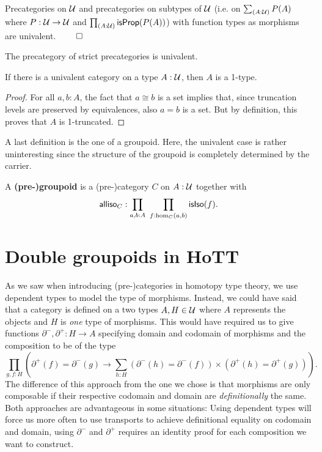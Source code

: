 \begin{lemma}
Precategories on $\mathcal{U}$ and 	precategories on subtypes of $\mathcal{U}$ (i.e. on
$\sum_{(A : \mathcal{U})} P(A)$ where $P : \mathcal{U} \to \mathcal{U}$ and $\prod_{(A : \mathcal{U})} \mathsf{isProp}(P(A))$)
with function types as morphisms are univalent. \hfill $\qed$
\end{lemma}

\begin{lemma}
The precategory of strict precategories is univalent.
\end{lemma}


\begin{lemma} \label{thm:cat-1-type}
If there is a univalent category on a type $A : \mathcal{U}$, then $A$ is a 1-type.
\end{lemma}

\begin{proof}
For all $a, b : A$, the fact that $a \cong b$ is a set implies that, since
truncation levels are preserved by equivalences, also $a = b$ is a set.
But by definition, this proves that $A$ is 1-truncated.
\end{proof}

A last definition is the one of a groupoid.
Here, the univalent case is rather uninteresting since the structure of the groupoid
is completely determined by the carrier. %

\begin{defn}
A \textbf{(pre-)groupoid} is a (pre-)category $C$ on $A : \mathcal{U}$ together with
\begin{equation*}
\mathsf{alliso}_C : \prod_{a,b:A} ~ \prod_{f:\hom_C(a,b)} \mathsf{isIso}(f) \text{.}
\end{equation*}
\end{defn}

\section{Double groupoids in HoTT}

As we saw when introducing (pre-)categories in homotopy type theory, we use
dependent types to model the type of morphisms. Instead, we could have said that
a category is defined on a two types $A, H \in \mathcal{U}$ where $A$ represents the objects
and $H$ is \emph{one} type of morphisms.
This would have required us to give functions $\partial^-, \partial^+ : H \to A$
specifying domain and codomain of morphisms and the composition to be of the type
\begin{equation*}
\prod_{g,f:H} \left(\partial^+(f) = \partial^-(g) \to 
	\sum_{h:H} \left(\partial^-(h)=\partial^-(f)\right)
		\times \left(\partial^+(h)=\partial^+(g) \right) \right) \text{.}
\end{equation*}
The difference of this approach from the one we chose is that morphisms are only
composable if their respective codomain and domain are \emph{definitionally}
the same. Both approaches are advantageous in some situations:
Using dependent types will force us more often to use transports to achieve
definitional equality on codomain and domain, using $\partial^-$ and $\partial^+$
requires an identity proof for each composition we want to construct.

